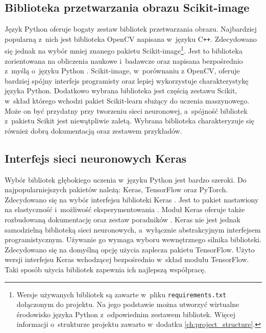 \subsection{Biblioteka przetwarzania obrazu Scikit-image}
Język Python oferuje bogaty zestaw bibliotek przetwarzania obrazu.
Najbardziej popularną z~nich jest biblioteka OpenCV napisana w~języku
C\texttt{++}.
Zdecydowano się jednak na wybór mniej znanego pakietu Scikit-image\footnote{%
\label{foot:version_req}Wersje używanych bibliotek są zawarte w~pliku
\texttt{requirements.txt} dołączonym do projektu.
Na jego podstawie można utworzyć wirtualne środowisko języka Python
z~odpowiednim zestawem bibliotek.
Więcej informacji o~strukturze projektu zawarto w~dodatku
\ref{ch:project_structure}.%
}.
Jest to biblioteka zorientowana na obliczenia naukowe i~badawcze oraz napisana
bezpośrednio z~myślą o~języku Python \cite{scikit-image}.
Scikit-image, w~porównaniu z OpenCV, oferuje bardziej spójny interfejs
programisty oraz lepiej wykorzystuje charakterystykę języka Python.
Dodatkowo wybrana biblioteka jest częścią zestawu Scikit, w~skład którego
wchodzi pakiet Scikit-learn służący do uczenia maszynowego.
Może on być przydatny przy tworzeniu sieci neuronowej, a~spójność bibliotek
z~pakietu Scikit jest niewątpliwie zaletą.
Wybrana biblioteka charakteryzuje się również dobrą dokumentacją
\cite{scikit_reference} oraz zestawem przykładów.

\subsection{Interfejs sieci neuronowych Keras}
\label{subsec:software_network}
Wybór bibliotek głębokiego uczenia w~języku Python jest bardzo szeroki.
Do najpopularniejszych pakietów należą: Keras, TensorFlow oraz PyTorch.
Zdecydowano się na wybór interfejsu biblioteki Keras%
.
Jest to pakiet nastawiony na elastyczność i~możliwość eksperymentowania
\cite{chollet_keras}.
Moduł Keras oferuje także rozbudowaną dokumentację oraz zestaw poradników
\cite{keras_docs}.
Keras nie jest jednak samodzielną biblioteką sieci neuronowych,
a~wyłącznie abstrakcyjnym interfejsem programistycznym.
Używanie go wymaga wyboru wewnętrznego silnika biblioteki.
Zdecydowano się na domyślną opcję użycia zaplecza pakietu TensorFlow.
Użyto wersji interfejsu Keras wchodzącej bezpośrednio w~skład modułu TensorFlow.
Taki sposób użycia bibliotek zapewnia ich najlepszą współpracę.

